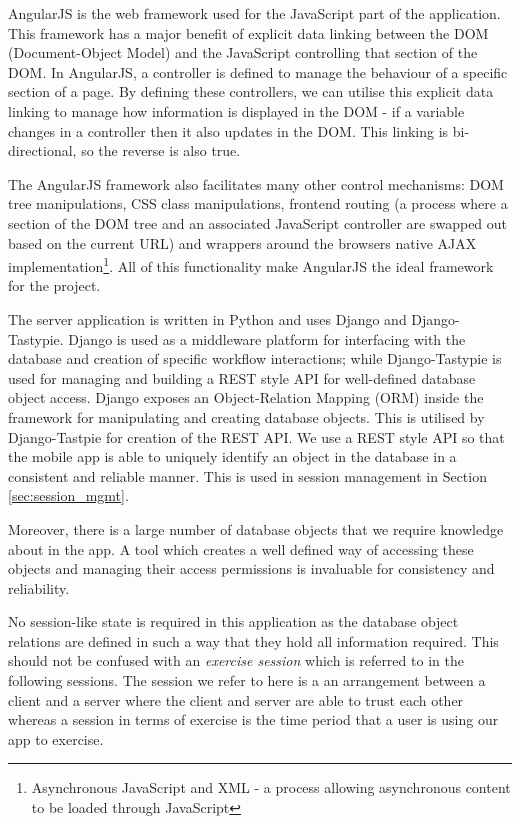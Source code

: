 AngularJS\cite{angularjs} is the web framework used for the
JavaScript part of the application. This framework has a major benefit
of explicit data linking between the DOM (Document-Object Model) and
the JavaScript controlling that section of the DOM. In AngularJS, a
controller is defined to manage the behaviour of a specific section of
a page. By defining these controllers, we can utilise this explicit
data linking to manage how information is displayed in the DOM - if a
variable changes in a controller then it also updates in the DOM. This
linking is bi-directional, so the reverse is also true. 

The AngularJS framework also facilitates many other control
mechanisms: DOM tree manipulations, CSS class manipulations, frontend
routing (a process where a section of the DOM tree and an associated
JavaScript controller are swapped out based on the current URL) and
wrappers around the browsers native AJAX implementation\footnote{Asynchronous
JavaScript and XML - a process allowing asynchronous content to be
loaded through JavaScript}. All of this
functionality make AngularJS the ideal framework for the project. 

The server application is written in Python and uses Django\cite{django}
and Django-Tastypie\cite{tastypie}. Django is used as a middleware
platform for interfacing with the database and creation of specific
workflow interactions; while Django-Tastypie is used for managing and
building a REST style API for well-defined database object access.
Django exposes an Object-Relation Mapping (ORM) inside the framework
for manipulating and creating database objects. This is utilised by
Django-Tastpie for creation of the REST API. We use a REST style API
so that the mobile app is able to uniquely identify an object in the
database in a consistent and reliable manner. This is used in 
session management in Section \ref{sec:session_mgmt}.

Moreover, there is a large number of database objects that we require
knowledge about in the app. A tool which creates a well defined way of
accessing these objects and managing their access permissions is
invaluable for consistency and reliability.

No session-like state is required in this application as the database
object relations are defined in such a way that they hold all
information required. This should not be confused with an
\emph{exercise session} which is referred to in the following
sessions. The session we refer to here is a an arrangement between a
client and a server where the client and server are able to trust each
other whereas a session in terms of exercise is the time period that a
user is using our app to exercise.

